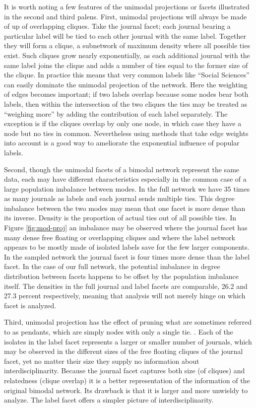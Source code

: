 \documentclass[]{book}
\theoremstyle{definition}
\theoremstyle{definition}
\theoremstyle{definition}
\theoremstyle{remark}
\begin{document}
It is worth noting a few features of the unimodal projections or facets
illustrated in the second and third palens. First, unimodal projections
will always be made of up of overlapping cliques. Take the journal
facet; each journal bearing a particular label will be tied to each
other journal with the same label. Together they will form a clique, a
subnetwork of maximum density where all possible ties exist. Such
cliques grow nearly exponentially, as each additional journal with the
same label joins the clique and adds a number of ties equal to the
former size of the clique. In practice this means that very common
labels like ``Social Sciences'' can easily dominate the unimodal
projection of the network. Here the weighting of edges becomes
important; if two labels overlap because some nodes bear both labels,
then within the intersection of the two cliques the ties may be treated
as ``weighing more'' by adding the contribution of each label
separately. The exception is if the cliques overlap by only one node, in
which case they have a node but no ties in common. Nevertheless using
methods that take edge weights into account is a good way to ameliorate
the exponential influence of popular labels.

Second, though the unimodal facets of a bimodal network represent the
same data, each may have different characteristics especially in the
common case of a large population imbalance between modes. In the full
network we have 35 times as many journals as labels and each journal
sends multiple ties. This degree imbalance between the two modes may
mean that one facet is more dense than its inverse. Density is the
proportion of actual ties out of all possible ties. In Figure
\ref{fig:mod-proj} an imbalance may be observed where the journal facet
has many dense free floating or overlapping cliques and where the label
network appears to be mostly made of isolated labels save for the few
larger components. In the sampled network the journal facet is four
times more dense than the label facet. In the case of our full network,
the potential imbalance in degree distribution between facets happens to
be offset by the population imbalance itself. The densities in the full
journal and label facets are comparable, 26.2 and 27.3 percent
respectively, meaning that analysis will not merely hinge on which facet
is analyzed.

Third, unimodal projection has the effect of pruning what are sometimes
referred to as pendants, which are simply nodes with only a single tie.
. Each of the isolates in the label facet represents a larger or smaller
number of journals, which may be observed in the different sizes of the
free floating cliques of the journal facet, yet no matter their size
they supply no information about interdisciplinarity. Because the
journal facet captures both size (of cliques) and relatedness (clique
overlap) it is a better representation of the information of the
original bimodal network. Its drawback is that it is larger and more
unwieldy to analyze. The label facet offers a simpler picture of
interdisciplinarity.
\end{document}
